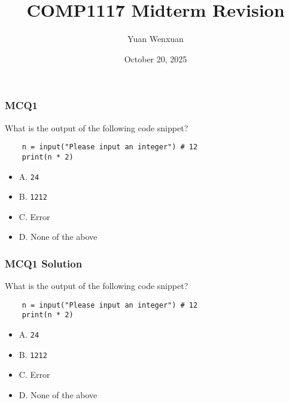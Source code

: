 \documentclass{beamer}
\title{COMP1117 Midterm Revision}
\author{Yuan Wenxuan}
\date{October 20, 2025}
\begin{document}
\frame{\titlepage}


\begin{frame}[fragile]
    \frametitle{MCQ1}
    What is the output of the following code snippet?
    \begin{verbatim}
    n = input("Please input an integer") # 12
    print(n * 2)
    \end{verbatim}

    \begin{itemize}
        \item A. \texttt{24}
        \item B. \texttt{1212}
        \item C. Error
        \item D. None of the above
    \end{itemize}
\end{frame}
\begin{frame}[fragile]
    \frametitle{MCQ1 Solution}
    What is the output of the following code snippet?
    \begin{verbatim}
    n = input("Please input an integer") # 12
    print(n * 2)
    \end{verbatim}

    \begin{itemize}
        \item A. \texttt{24}
        \item \alert{B. \texttt{1212}}
        \item C. Error
        \item D. None of the above
    \end{itemize}
\end{frame}
\end{document}
